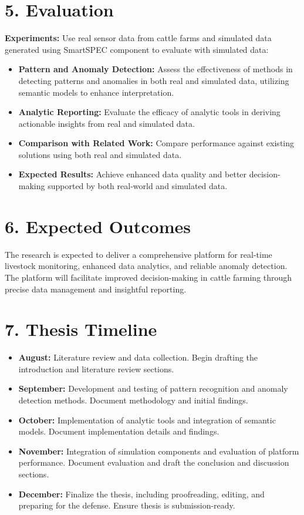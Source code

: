 \documentclass[11pt]{article}
\begin{document}
\section*{5. Evaluation}
\textbf{Experiments:} Use real sensor data from cattle farms and simulated data generated using SmartSPEC component to evaluate with simulated data:
\begin{itemize}
    \item \textbf{Pattern and Anomaly Detection:} Assess the effectiveness of methods in detecting patterns and anomalies in both real and simulated data, utilizing semantic models to enhance interpretation.
    \item \textbf{Analytic Reporting:} Evaluate the efficacy of analytic tools in deriving actionable insights from real and simulated data.
    \item \textbf{Comparison with Related Work:} Compare performance against existing solutions using both real and simulated data.
    \item \textbf{Expected Results:} Achieve enhanced data quality and better decision-making supported by both real-world and simulated data.
\end{itemize}



\section*{6. Expected Outcomes}
The research is expected to deliver a comprehensive platform for real-time livestock monitoring, enhanced data analytics, and reliable anomaly detection. The platform will facilitate improved decision-making in cattle farming through precise data management and insightful reporting.

\section*{7. Thesis Timeline}
\begin{itemize}
    \item \textbf{August:} Literature review and data collection. Begin drafting the introduction and literature review sections.
    \item \textbf{September:} Development and testing of pattern recognition and anomaly detection methods. Document methodology and initial findings.
    \item \textbf{October:} Implementation of analytic tools and integration of semantic models. Document implementation details and findings.
    \item \textbf{November:} Integration of simulation components and evaluation of platform performance. Document evaluation and draft the conclusion and discussion sections.
    \item \textbf{December:} Finalize the thesis, including proofreading, editing, and preparing for the defense. Ensure thesis is submission-ready.
\end{itemize}
\end{document}
